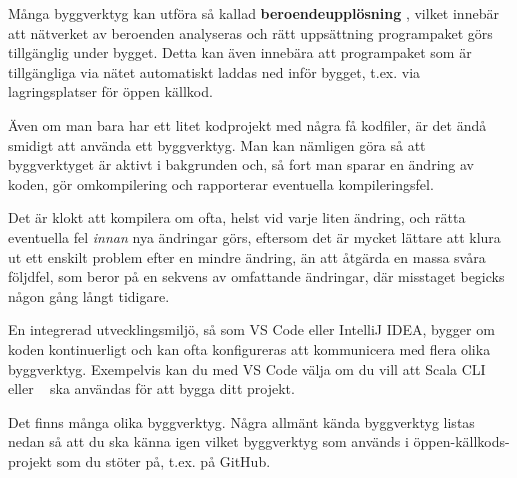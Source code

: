 Många byggverktyg kan utföra så kallad \textbf{beroendeupplösning} , vilket innebär att nätverket av beroenden analyseras och rätt uppsättning programpaket görs tillgänglig under bygget. Detta kan även innebära att programpaket som är tillgängliga via nätet automatiskt laddas ned inför bygget, t.ex. via lagringsplatser för öppen källkod.

Även om man bara har ett litet kodprojekt med några få kodfiler, är det ändå smidigt att använda ett byggverktyg. Man kan nämligen göra så att byggverktyget är aktivt i bakgrunden och, så fort man sparar en ändring av koden, gör omkompilering och rapporterar eventuella kompileringsfel.

Det är klokt att kompilera om ofta, helst vid varje liten ändring, och rätta eventuella fel \textit{innan} nya ändringar görs, eftersom det är mycket lättare att klura ut ett enskilt problem efter en mindre ändring, än att åtgärda en massa svåra följdfel, som beror på en sekvens av omfattande ändringar, där misstaget begicks någon gång långt tidigare.

En integrerad utvecklingsmiljö, så som VS Code eller IntelliJ IDEA, bygger om koden kontinuerligt och kan ofta konfigureras att kommunicera med flera olika byggverktyg. Exempelvis kan du med VS Code välja om du vill att Scala CLI eller \sbt~ ska användas för att bygga ditt projekt.

Det finns många olika byggverktyg. Några allmänt kända byggverktyg listas nedan så att du ska känna igen vilket byggverktyg som används i öppen-källkods-projekt som du stöter på, t.ex. på GitHub.


